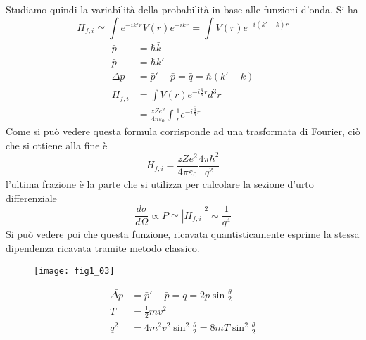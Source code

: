 Studiamo quindi la variabilità della probabilità in base alle funzioni d'onda. 
Si ha
\begin{equation}
H_{f,i}\simeq \int e^{-ik'r} V(r)e^{+ikr}=\int V(r)e^{-i(k'-k)r}
\end{equation}
\begin{equation}
\begin{split}
\bar p &=\hbar \bar k\\
\bar p &=\hbar k'\\ 
\Delta p &=\bar p' -\bar p=\bar q=\hbar (k'-k)\\
H_{f,i}&=\int V(r) e^{-i\frac{\bar q}{\hbar}r}d^3r\\
&=\frac{zZe^2}{4\pi\varepsilon_0}\int \frac{1}{r}e^{-i\frac{\bar q}{\hbar}r}
\end{split}
\end{equation}
Come si può vedere questa formula corrisponde ad una trasformata di Fourier, ciò che si ottiene alla fine è
\begin{equation}
H_{f,i}=\frac{zZe^2}{4\pi\varepsilon_0}\frac{4\pi\hbar^2}{q^2}
\end{equation}
l'ultima frazione è la parte che si utilizza per calcolare la sezione d'urto differenziale
\begin{equation}
\frac{d\sigma}{d\Omega}\propto P\simeq |H_{f,i}|^2\sim\frac{1}{q^4}
\end{equation}
Si può vedere poi che questa funzione, ricavata quantisticamente esprime la stessa dipendenza ricavata tramite metodo classico.

\begin{figure}[h]
\centering
\texttt{[image: fig1\_03]}
\label{fig:1.3}
\end{figure}

\begin{equation}
\begin{split}
\bar{\Delta p} &=\bar p'-\bar p=q=2p \sin\frac{\theta}{2}\\
T &=\frac{1}{2}mv^2\\
q^2 &=4m^2v^2\sin^2 \frac{\theta}{2}=8mT\sin^2\frac{\theta}{2}
\end{split}
\end{equation}

